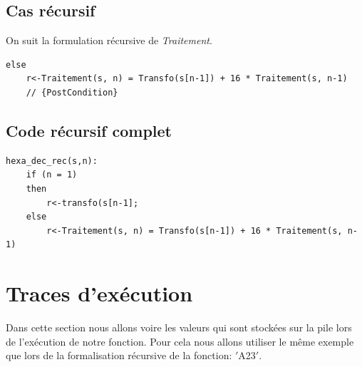 \documentclass[a4paper, 11pt, oneside]{article}
\begin{document}
\subsection{Cas récursif}


On suit la formulation récursive de \textit{Traitement}.

\begin{lstlisting}
else
    r<-Traitement(s, n) = Transfo(s[n-1]) + 16 * Traitement(s, n-1)
    // {PostCondition}
\end{lstlisting}


\subsection{Code récursif complet}


\begin{lstlisting}
hexa_dec_rec(s,n):
    if (n = 1)
    then
        r<-transfo(s[n-1];
    else
        r<-Traitement(s, n) = Transfo(s[n-1]) + 16 * Traitement(s, n-1)
\end{lstlisting}


\section{Traces d'exécution}\label{traces}


Dans cette section nous allons voire les valeurs qui sont stockées sur la pile
lors de l'exécution de notre fonction. Pour cela nous allons utiliser le même 
exemple que lors de la formalisation récursive de la fonction: $'$A23$'$.
\vspace{0.5cm}
\end{document}
